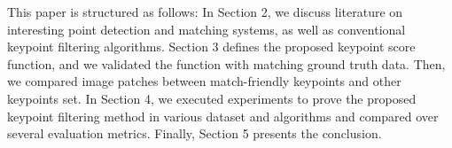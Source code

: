 This paper is structured as follows: In Section 2, we discuss literature on interesting point detection and matching systems, as well as conventional keypoint filtering algorithms. Section 3 defines the proposed keypoint score function, and we validated the function with matching ground truth data. Then, we compared image patches between match-friendly keypoints and other keypoints set. In Section 4, we executed experiments to prove the proposed keypoint filtering method in various dataset and algorithms and compared over several evaluation metrics. Finally, Section 5 presents the conclusion.



